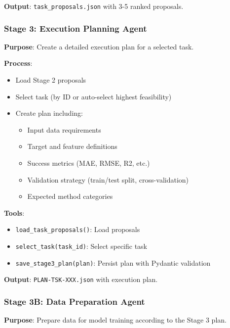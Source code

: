 \documentclass[11pt,a4paper]{article}
\begin{document}
\textbf{Output}: \texttt{task\_proposals.json} with 3-5 ranked proposals.

\subsubsection{Stage 3: Execution Planning Agent}

\textbf{Purpose}: Create a detailed execution plan for a selected task.

\textbf{Process}:
\begin{itemize}
    \item Load Stage 2 proposals
    \item Select task (by ID or auto-select highest feasibility)
    \item Create plan including:
    \begin{itemize}
        \item Input data requirements
        \item Target and feature definitions
        \item Success metrics (MAE, RMSE, R2, etc.)
        \item Validation strategy (train/test split, cross-validation)
        \item Expected method categories
    \end{itemize}
\end{itemize}

\textbf{Tools}:
\begin{itemize}
    \item \texttt{load\_task\_proposals()}: Load proposals
    \item \texttt{select\_task(task\_id)}: Select specific task
    \item \texttt{save\_stage3\_plan(plan)}: Persist plan with Pydantic validation
\end{itemize}

\textbf{Output}: \texttt{PLAN-TSK-XXX.json} with execution plan.

\subsubsection{Stage 3B: Data Preparation Agent}

\textbf{Purpose}: Prepare data for model training according to the Stage 3 plan.
\end{document}

